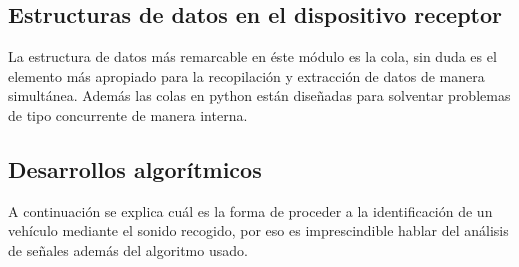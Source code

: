 \subsection{Estructuras de datos en el dispositivo receptor}
La estructura de datos más remarcable en éste módulo es la cola, sin duda es el elemento más apropiado para la recopilación y extracción de datos de manera simultánea. Además las colas en python están diseñadas para solventar problemas de tipo concurrente de manera interna.

\subsection{Desarrollos algorítmicos}

A continuación se explica cuál es la forma de proceder a la identificación de un vehículo mediante el sonido recogido, por eso es imprescindible hablar del análisis de señales además del algoritmo usado.

